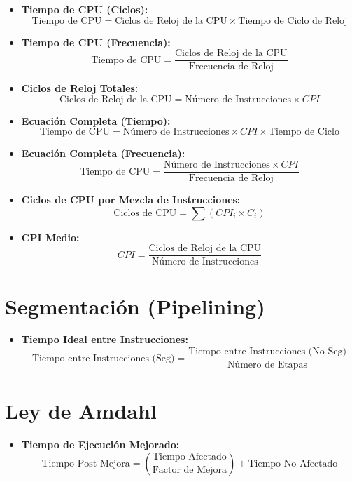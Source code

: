 \documentclass[12pt,a4paper]{article}
\begin{document}
\begin{itemize}
    \item \textbf{Tiempo de CPU (Ciclos):} 
    $$\text{Tiempo de CPU} = \text{Ciclos de Reloj de la CPU} \times \text{Tiempo de Ciclo de Reloj}$$

    \item \textbf{Tiempo de CPU (Frecuencia):} 
    $$\text{Tiempo de CPU} = \frac{\text{Ciclos de Reloj de la CPU}}{\text{Frecuencia de Reloj}}$$

    \item \textbf{Ciclos de Reloj Totales:} 
    $$\text{Ciclos de Reloj de la CPU} = \text{Número de Instrucciones} \times CPI$$

    \item \textbf{Ecuación Completa (Tiempo):} 
    $$\text{Tiempo de CPU} = \text{Número de Instrucciones} \times CPI \times \text{Tiempo de Ciclo}$$

    \item \textbf{Ecuación Completa (Frecuencia):} 
    $$\text{Tiempo de CPU} = \frac{\text{Número de Instrucciones} \times CPI}{\text{Frecuencia de Reloj}}$$

    \item \textbf{Ciclos de CPU por Mezcla de Instrucciones:} 
    $$\text{Ciclos de CPU} = \sum (CPI_i \times C_i)$$

    \item \textbf{CPI Medio:} 
    $$CPI = \frac{\text{Ciclos de Reloj de la CPU}}{\text{Número de Instrucciones}}$$
\end{itemize}

\section*{Segmentación (Pipelining)}

\begin{itemize}
    \item \textbf{Tiempo Ideal entre Instrucciones:} 
    $$\text{Tiempo entre Instrucciones (Seg)} = \frac{\text{Tiempo entre Instrucciones (No Seg)}}{\text{Número de Etapas}}$$
\end{itemize}

\section*{Ley de Amdahl}

\begin{itemize}
    \item \textbf{Tiempo de Ejecución Mejorado:} 
    $$\text{Tiempo Post-Mejora} = \left(\frac{\text{Tiempo Afectado}}{\text{Factor de Mejora}}\right) + \text{Tiempo No Afectado}$$
\end{itemize}
\end{document}
